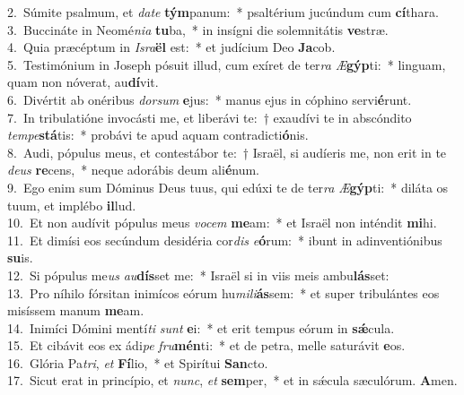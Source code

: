 {2.~}Súmite psalmum, et \textit{da}\textit{te} \textbf{tým}panum:~* psaltérium jucúndum cum \textbf{cí}thara.\\
{3.~}Buccináte in Neomé\textit{ni}\textit{a} \textbf{tu}ba,~* in insígni die solemnitátis \textbf{ve}stræ.\\
{4.~}Quia præcéptum in \textit{Is}\textit{ra}\textbf{ël} est:~* et judícium Deo \textbf{Ja}cob.\\
{5.~}Testimónium in Joseph pósuit illud, cum exíret de ter\textit{ra} \textit{Æ}\textbf{gýp}ti:~* linguam, quam non nóverat, au\textbf{dí}vit.\\
{6.~}Divértit ab onéribus \textit{dor}\textit{sum} \textbf{e}jus:~* manus ejus in cóphino servi\textbf{é}runt.\\
{7.~}In tribulatióne invocásti me, et liberávi te:~† exaudívi te in abscóndito \textit{tem}\textit{pe}\textbf{stá}tis:~* probávi te apud aquam contradicti\textbf{ó}nis.\\
{8.~}Audi, pópulus meus, et contestábor te:~† Israël, si audíeris me, non erit in te \textit{de}\textit{us} \textbf{re}cens,~* neque adorábis deum ali\textbf{é}num.\\
{9.~}Ego enim sum Dóminus Deus tuus, qui edúxi te de ter\textit{ra} \textit{Æ}\textbf{gýp}ti:~* diláta os tuum, et implébo \textbf{il}lud.\\
{10.~}Et non audívit pópulus meus \textit{vo}\textit{cem} \textbf{me}am:~* et Israël non inténdit \textbf{mi}hi.\\
{11.~}Et dimísi eos secúndum desidéria cor\textit{dis} \textit{e}\textbf{ó}rum:~* ibunt in adinventiónibus \textbf{su}is.\\
{12.~}Si pópulus me\textit{us} \textit{au}\textbf{dís}set me:~* Israël si in viis meis ambu\textbf{lás}set:\\
{13.~}Pro níhilo fórsitan inimícos eórum hu\textit{mi}\textit{li}\textbf{ás}sem:~* et super tribulántes eos misíssem manum \textbf{me}am.\\
{14.~}Inimíci Dómini mentí\textit{ti} \textit{sunt} \textbf{e}i:~* et erit tempus eórum in \textbf{sǽ}cula.\\
{15.~}Et cibávit eos ex ádi\textit{pe} \textit{fru}\textbf{mén}ti:~* et de petra, melle saturávit \textbf{e}os.\\
{16.~}Glória Pa\textit{tri}, \textit{et} \textbf{Fí}lio,~* et Spirítui \textbf{San}cto.\\
{17.~}Sicut erat in princípio, et \textit{nunc}, \textit{et} \textbf{sem}per,~* et in sǽcula sæculórum. \textbf{A}men.\\
